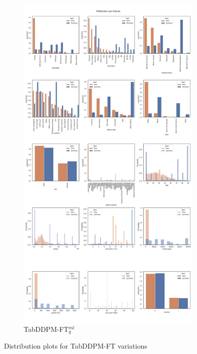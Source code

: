 \begin{landscape}
\begin{figure}[h]
		\hfill
		\begin{subfigure}{0.4\linewidth}
			\includegraphics[height=\textheight,width=\linewidth,keepaspectratio]{images/distributions_full/tab-ddpm-ft-simTune.jpg}
			\caption{TabDDPM-FT$^{ml}_q$}
		\end{subfigure}
		\caption{Distribution plots for TabDDPM-FT variations}
		\label{fig_a:dist_5}
	\end{figure}
\end{landscape}



